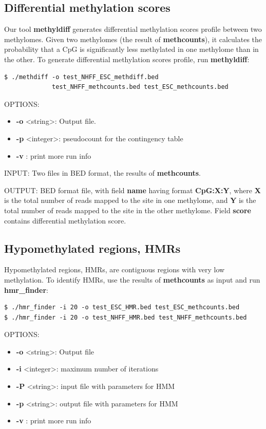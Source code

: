\documentclass{article}
\begin{document}
\subsection{Differential methylation scores}
\label{sec:methyldiff}

Our tool \textbf{methyldiff} generates differential methylation scores profile between
two methylomes. Given two methylomes (the result of \textbf{methcounts}), it calculates
the probability that a CpG is significantly less methylated in one methylome than in the other.
To generate differential methylation scores profile, run \textbf{methyldiff}:

\begin{verbatim}
$ ./methdiff -o test_NHFF_ESC_methdiff.bed 
             test_NHFF_methcounts.bed test_ESC_methcounts.bed
\end{verbatim}

OPTIONS:
\begin{itemize}
\item
\textbf{-o} \textless string\textgreater : Output file.
\item
\textbf{-p} \textless integer\textgreater : pseudocount for the contingency table
\item
\textbf{-v} : print more run info
\end{itemize}

INPUT: Two files in BED format, the results of \textbf{methcounts}.

OUTPUT: BED format file, with field \textbf{name} having format \textbf{CpG:X:Y}, 
where \textbf{X} is the total number of reads mapped to the site in one methylome, 
and \textbf{Y} is the total number of reads mapped to the site in the other methylome.
Field \textbf{score} contains differential methylation score.

\subsection{Hypomethylated regions, HMRs}
\label{sec:ident-hypo-methyl}

Hypomethylated regions, HMRs, are contiguous regions with very low methylation.
To identify HMRs, use the results of \textbf{methcounts} as input and run
\textbf{hmr\_finder}:
\begin{verbatim}
$ ./hmr_finder -i 20 -o test_ESC_HMR.bed test_ESC_methcounts.bed
$ ./hmr_finder -i 20 -o test_NHFF_HMR.bed test_NHFF_methcounts.bed
\end{verbatim}

OPTIONS:
\begin{itemize}
\item
\textbf{-o} \textless string\textgreater : Output file
\item
\textbf{-i} \textless integer\textgreater : maximum number of iterations 
\item
\textbf{-P} \textless string\textgreater : input file with parameters for HMM
\item
\textbf{-p} \textless string\textgreater : output file with parameters for HMM
\item
\textbf{-v} : print more run info 
\end{itemize}
\end{document}
